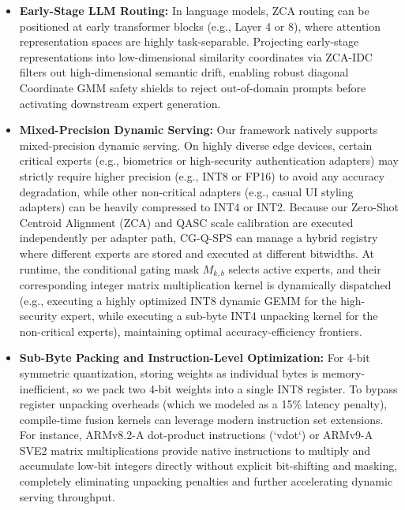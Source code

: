 \begin{itemize}
  \item \textbf{Early-Stage LLM Routing:} In language models, ZCA routing can be positioned at early transformer blocks (e.g., Layer 4 or 8), where attention representation spaces are highly task-separable. Projecting early-stage representations into low-dimensional similarity coordinates via ZCA-IDC filters out high-dimensional semantic drift, enabling robust diagonal Coordinate GMM safety shields to reject out-of-domain prompts before activating downstream expert generation.
  \item \textbf{Mixed-Precision Dynamic Serving:} Our framework natively supports mixed-precision dynamic serving. On highly diverse edge devices, certain critical experts (e.g., biometrics or high-security authentication adapters) may strictly require higher precision (e.g., INT8 or FP16) to avoid any accuracy degradation, while other non-critical adapters (e.g., casual UI styling adapters) can be heavily compressed to INT4 or INT2. Because our Zero-Shot Centroid Alignment (ZCA) and QASC scale calibration are executed independently per adapter path, CG-Q-SPS can manage a hybrid registry where different experts are stored and executed at different bitwidths. At runtime, the conditional gating mask $M_{k, b}$ selects active experts, and their corresponding integer matrix multiplication kernel is dynamically dispatched (e.g., executing a highly optimized INT8 dynamic GEMM for the high-security expert, while executing a sub-byte INT4 unpacking kernel for the non-critical experts), maintaining optimal accuracy-efficiency frontiers.
  \item \textbf{Sub-Byte Packing and Instruction-Level Optimization:} For 4-bit symmetric quantization, storing weights as individual bytes is memory-inefficient, so we pack two 4-bit weights into a single INT8 register. To bypass register unpacking overheads (which we modeled as a 15\% latency penalty), compile-time fusion kernels can leverage modern instruction set extensions. For instance, ARMv8.2-A dot-product instructions (`vdot`) or ARMv9-A SVE2 matrix multiplications provide native instructions to multiply and accumulate low-bit integers directly without explicit bit-shifting and masking, completely eliminating unpacking penalties and further accelerating dynamic serving throughput.
\end{itemize}

